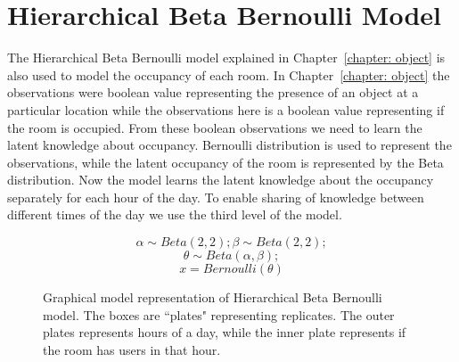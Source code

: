 \section{Hierarchical Beta Bernoulli Model}

The Hierarchical Beta Bernoulli model explained in Chapter~\ref{chapter: object} is also used to model the occupancy of each room. In Chapter~\ref{chapter: object} the observations were boolean value representing the presence of an object at a particular location while the observations here is a boolean value representing if the room is occupied. From these boolean observations we need to learn the latent knowledge about occupancy. Bernoulli distribution is used to represent the observations, while the latent occupancy of the room is represented by the Beta distribution. 
Now the model learns the latent knowledge about the occupancy separately for each hour of the day. To enable sharing of knowledge between different times of the day we use the third level of the model.
\noindent
\begin{figure}[htp]


\begin{minipage}{0.3\textwidth}
\centering


\end{minipage}%
\begin{minipage}{0.7\textwidth}

\begin{equation*}
	\alpha \sim Beta(2,2) ; \beta \sim Beta(2, 2);
\end{equation*}
\begin{equation*}
	\theta \sim Beta(\alpha, \beta);
\end{equation*}
\begin{equation*}
	x = Bernoulli(\theta)
\end{equation*}
\end{minipage}
\caption[Hierarchical Beta Bernoulli graphical model]{Graphical model representation of Hierarchical Beta Bernoulli model. The boxes are ``plates" representing replicates. The outer plates represents hours of a day, while the inner plate represents if the room has users in that hour.}
\label{bbm2}
\end{figure}



